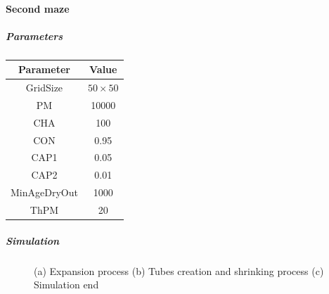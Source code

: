 \paragraph{Second maze}

\subparagraph{Parameters}

\begin{center}
 \begin{tabular}{||c c||} 
 \hline
 Parameter & Value \\ [0.5ex] 
 \hline\hline
 GridSize & $50 \times 50$ \\ 
 \hline
 PM & 10000 \\ 
 \hline
 CHA & 100 \\ 
 \hline
 CON & 0.95 \\ 
 \hline
 CAP1 & 0.05 \\ 
 \hline
 CAP2 & 0.01 \\ 
 \hline
 MinAgeDryOut & 1000 \\
 \hline
 ThPM & 20 \\ [1ex] 
 \hline
 \end{tabular}
\end{center}

\subparagraph{Simulation}

\begin{figure}[H]
    \centering
    \caption{(a) Expansion process (b) Tubes creation and shrinking process (c) Simulation end}
    \label{fig:foobar}
\end{figure}
